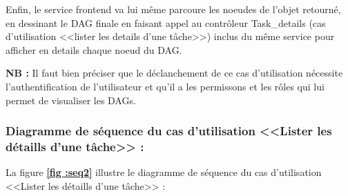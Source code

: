     \par Enfin, le service frontend va lui même parcoure les noeudes de l'objet retourné, en dessinant le DAG finale en faisant appel au contrôleur Task\_details (cas d'utilisation <<lister les details d'une tâche>>) inclus du même service pour afficher en details chaque noeud du DAG.
    \par \textbf{NB :} Il faut bien préciser que le déclanchement de ce cas d'utilisation nécessite l'authentification de l'utilisateur et qu'il a les permissons et les rôles qui lui permet de visualiser les DAGs.
    \subsubsection{Diagramme de séquence du cas d'utilisation <<Lister les détaills d'une tâche>> :}
    \par La figure \textbf{\ref*{fig :seq2}} illustre le diagramme de séquence du cas d'utilisation <<Lister les détaills d'une tâche>> :

